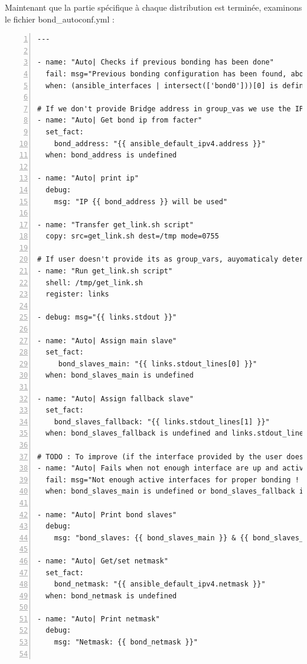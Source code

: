 \documentclass[14 pt,a4paper]{extreport}
\begin{document}
Maintenant que la partie spécifique à chaque distribution est terminée, examinons le fichier bond\_autoconf.yml :

\begin{framed}
\begin{Verbatim}[fontsize=\tiny,numbers=left]
---

- name: "Auto| Checks if previous bonding has been done"
  fail: msg="Previous bonding configuration has been found, aborting..."
  when: (ansible_interfaces | intersect(['bond0']))[0] is defined

# If we don't provide Bridge address in group_vas we use the IP address already defined throught the PXE install.
- name: "Auto| Get bond ip from facter"
  set_fact:
    bond_address: "{{ ansible_default_ipv4.address }}"
  when: bond_address is undefined

- name: "Auto| print ip"
  debug:
    msg: "IP {{ bond_address }} will be used"

- name: "Transfer get_link.sh script"
  copy: src=get_link.sh dest=/tmp mode=0755

# If user doesn't provide its as group_vars, auyomaticaly determining slaves interfaces thah will be used in the bonding config.
- name: "Run get_link.sh script"
  shell: /tmp/get_link.sh
  register: links

- debug: msg="{{ links.stdout }}"

- name: "Auto| Assign main slave"
  set_fact:
     bond_slaves_main: "{{ links.stdout_lines[0] }}"
  when: bond_slaves_main is undefined

- name: "Auto| Assign fallback slave"
  set_fact:
    bond_slaves_fallback: "{{ links.stdout_lines[1] }}"
  when: bond_slaves_fallback is undefined and links.stdout_lines[1] != bond_slaves_main

# TODO : To improve (if the interface provided by the user doesn't have link)
- name: "Auto| Fails when not enough interface are up and active"
  fail: msg="Not enough active interfaces for proper bonding ! Please check interface configuration !"
  when: bond_slaves_main is undefined or bond_slaves_fallback is undefined
  
- name: "Auto| Print bond slaves"
  debug:
    msg: "bond_slaves: {{ bond_slaves_main }} & {{ bond_slaves_fallback }}"

- name: "Auto| Get/set netmask"
  set_fact:
    bond_netmask: "{{ ansible_default_ipv4.netmask }}"
  when: bond_netmask is undefined

- name: "Auto| Print netmask"
  debug:
    msg: "Netmask: {{ bond_netmask }}"


\end{Verbatim}
\end{framed}
\end{document}
